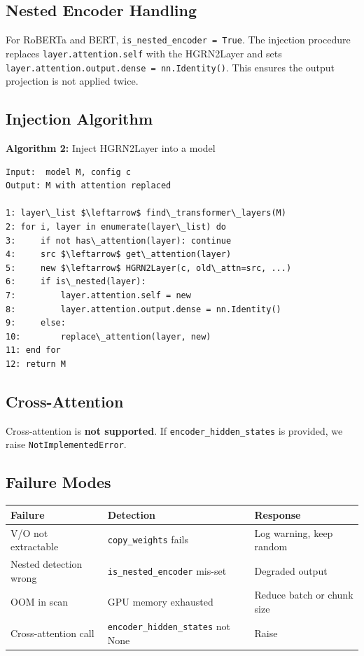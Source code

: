 \subsection{Nested Encoder Handling}

For RoBERTa and BERT, \texttt{is\_nested\_encoder = True}. The injection procedure 
replaces \texttt{layer.attention.self} with the HGRN2Layer and sets 
\texttt{layer.attention.output.dense = nn.Identity()}. This ensures the output 
projection is not applied twice.

\subsection{Injection Algorithm}

\textbf{Algorithm 2:} Inject HGRN2Layer into a model
\begin{lstlisting}
Input:  model M, config c
Output: M with attention replaced

1: layer\_list $\leftarrow$ find\_transformer\_layers(M)
2: for i, layer in enumerate(layer\_list) do
3:     if not has\_attention(layer): continue
4:     src $\leftarrow$ get\_attention(layer)
5:     new $\leftarrow$ HGRN2Layer(c, old\_attn=src, ...)
6:     if is\_nested(layer):
7:         layer.attention.self = new
8:         layer.attention.output.dense = nn.Identity()
9:     else:
10:        replace\_attention(layer, new)
11: end for
12: return M
\end{lstlisting}

\subsection{Cross-Attention}

Cross-attention is \textbf{not supported}. If \texttt{encoder\_hidden\_states} is provided, 
we raise \texttt{NotImplementedError}.

\subsection{Failure Modes}

\begin{table}[H]
\centering
\small
\begin{tabular}{lll}
\toprule
\textbf{Failure} & \textbf{Detection} & \textbf{Response} \\
\midrule
V/O not extractable & \texttt{copy\_weights} fails & Log warning, keep random \\
Nested detection wrong & \texttt{is\_nested\_encoder} mis-set & Degraded output \\
OOM in scan & GPU memory exhausted & Reduce batch or chunk size \\
Cross-attention call & \texttt{encoder\_hidden\_states} not None & Raise \\
\bottomrule
\end{tabular}
\end{table}

